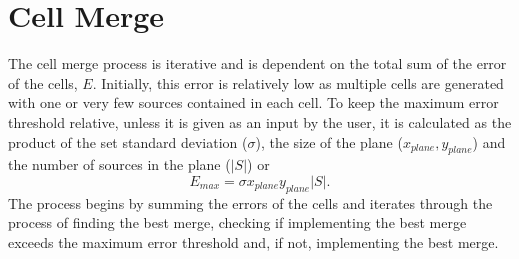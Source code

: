 \section{Cell Merge}\label{des:sec:merge}
The cell merge process is iterative and is dependent on the total sum of the error of the cells, $E$. Initially, this error is relatively low as multiple cells are generated with one or very few sources contained in each cell. To keep the maximum error threshold relative, unless it is given as an input by the user, it is calculated as the product of the set standard deviation ($\sigma$), the size of the plane ($x_{plane},y_{plane}$) and the number of sources in the plane ($|S|$) or 
\begin{equation}\label{des:eq:maxerr}
 E_{max} = \sigma x_{plane}y_{plane}|S|.
\end{equation}
The process begins by summing the errors of the cells and iterates through the process of finding the best merge, checking if implementing the best merge exceeds the maximum error threshold and, if not, implementing the best merge.

